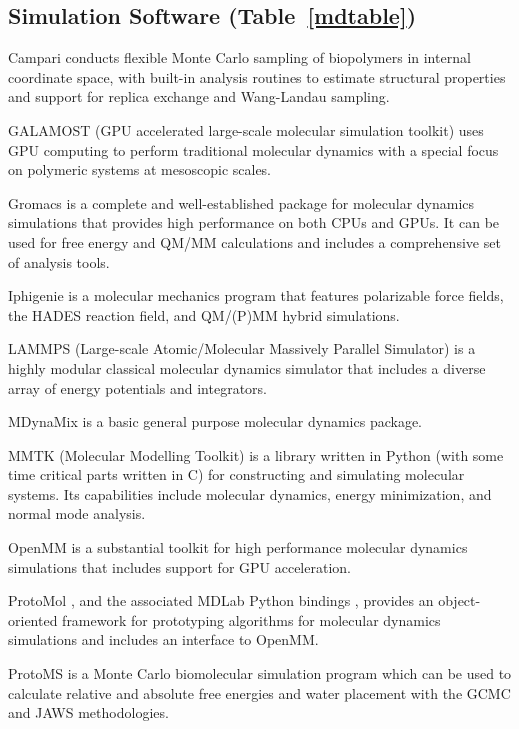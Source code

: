 \subsection*{Simulation Software (Table~\ref{mdtable})}

Campari \cite{Vitalis_2009} conducts flexible Monte Carlo sampling of biopolymers in internal coordinate space, with built-in analysis routines to estimate structural properties and support for replica exchange and Wang-Landau sampling.

GALAMOST (GPU accelerated large-scale molecular simulation toolkit) \cite{Zhu_2013} uses GPU computing to perform traditional molecular dynamics with a special focus on polymeric systems at mesoscopic scales.

Gromacs \cite{Pronk_2013} is a complete and well-established package for molecular dynamics simulations that provides high performance on both CPUs and GPUs.  It can be used for free energy and QM/MM calculations and includes a comprehensive set of analysis tools.

Iphigenie \cite{Lorenzen_2012} is a molecular mechanics program that features polarizable force fields, the HADES reaction field, and QM/(P)MM hybrid simulations.

LAMMPS  (Large-scale Atomic/Molecular Massively Parallel Simulator) \cite{Plimpton_1995} is a highly modular classical molecular dynamics simulator that includes a diverse array of energy potentials and integrators.

MDynaMix \cite{Lyubartsev_2000} is a basic general purpose molecular dynamics package.

MMTK (Molecular Modelling Toolkit) \cite{Hinsen_2000} is a library written in Python (with some time critical parts written in C) for constructing and simulating molecular systems.  Its capabilities include molecular dynamics, energy minimization, and normal mode analysis.

OpenMM  \cite{Eastman_2013} is a substantial toolkit for high performance molecular dynamics simulations that includes support for GPU acceleration.

ProtoMol \cite{Matthey_2004}, and the associated MDLab Python bindings \cite{Cickovski_2009}, provides an object-oriented framework for prototyping algorithms for molecular dynamics simulations and includes an interface to OpenMM.

ProtoMS \cite{Michel_2006} is a Monte Carlo biomolecular simulation program which can be used to calculate relative and absolute free energies and water placement with the GCMC and JAWS methodologies.

